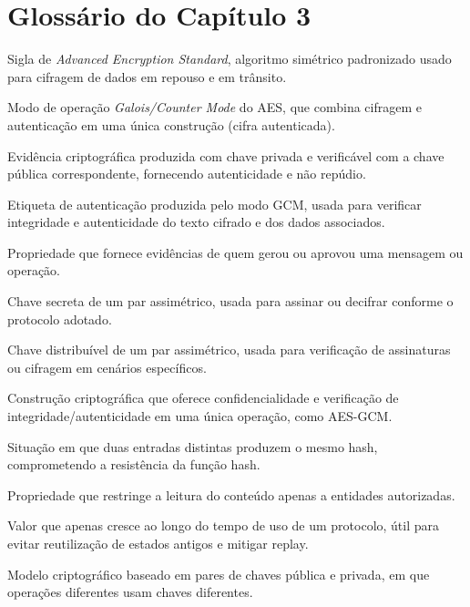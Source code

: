 \chapter*{Glossário do Capítulo 3}

\begin{description}[
  font=\normalfont\bfseries,
  style=multiline,
  leftmargin=5.6cm,
  labelwidth=4.9cm,
  labelsep=0.35cm,
  itemsep=0.55\baselineskip
]
  \item[AES] Sigla de \textit{Advanced Encryption Standard}, algoritmo simétrico padronizado usado para cifragem de dados em repouso e em trânsito.
  \item[AES-GCM] Modo de operação \textit{Galois/Counter Mode} do AES, que combina cifragem e autenticação em uma única construção (cifra autenticada).
  \item[Assinatura digital] Evidência criptográfica produzida com chave privada e verificável com a chave pública correspondente, fornecendo autenticidade e não repúdio.
  \item[AuthTag] Etiqueta de autenticação produzida pelo modo GCM, usada para verificar integridade e autenticidade do texto cifrado e dos dados associados.
  \item[Autenticidade] Propriedade que fornece evidências de quem gerou ou aprovou uma mensagem ou operação.
  \item[Chave privada] Chave secreta de um par assimétrico, usada para assinar ou decifrar conforme o protocolo adotado.
  \item[Chave pública] Chave distribuível de um par assimétrico, usada para verificação de assinaturas ou cifragem em cenários específicos.
  \item[Cifra autenticada] Construção criptográfica que oferece confidencialidade e verificação de integridade/autenticidade em uma única operação, como AES-GCM.
  \item[Colisão] Situação em que duas entradas distintas produzem o mesmo hash, comprometendo a resistência da função hash.
  \item[Confidencialidade] Propriedade que restringe a leitura do conteúdo apenas a entidades autorizadas.
  \item[Contador monotônico] Valor que apenas cresce ao longo do tempo de uso de um protocolo, útil para evitar reutilização de estados antigos e mitigar replay.
  \item[Criptografia assimétrica] Modelo criptográfico baseado em pares de chaves pública e privada, em que operações diferentes usam chaves diferentes.

\end{description}
